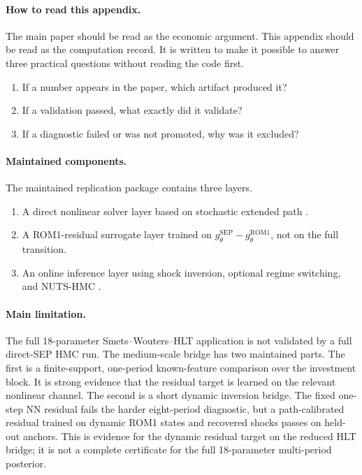 \documentclass[12pt]{article}
\newcommand{\rom}{\mathrm{ROM1}}
\newcommand{\sep}{\mathrm{SEP}}
\begin{document}
\paragraph{How to read this appendix.}
The main paper should be read as the economic argument. This appendix should be
read as the computation record. It is written to make it possible to answer
three practical questions without reading the code first.
\begin{enumerate}[leftmargin=2em,itemsep=0.2em]
\item If a number appears in the paper, which artifact produced it?
\item If a validation passed, what exactly did it validate?
\item If a diagnostic failed or was not promoted, why was it excluded?
\end{enumerate}

\paragraph{Maintained components.}
The maintained replication package contains three layers.
\begin{enumerate}[leftmargin=2em,itemsep=0.2em]
\item A direct nonlinear solver layer based on stochastic extended path
      \citep{fair1983solution,adjemian2025stochastic}.
\item A ROM1-residual surrogate layer trained on
      \(g^{\sep}_\theta-g^{\rom}_\theta\), not on the full transition.
\item An online inference layer using shock inversion, optional regime
      switching, and NUTS-HMC \citep{hoffman2014nuts}.
\end{enumerate}

\paragraph{Main limitation.}
The full 18-parameter Smets--Wouters--HLT application is not validated by a
full direct-SEP HMC run. The medium-scale bridge has two maintained parts. The
first is a finite-support, one-period known-feature comparison over the
investment block. It is strong evidence that the residual target is learned on
the relevant nonlinear channel. The second is a short dynamic inversion bridge.
The fixed one-step NN residual fails the harder eight-period diagnostic, but a
path-calibrated residual trained on dynamic ROM1 states and recovered shocks
passes on held-out anchors. This is evidence for the dynamic residual target on
the reduced HLT bridge; it is not a complete certificate for the full
18-parameter multi-period posterior.
\end{document}
